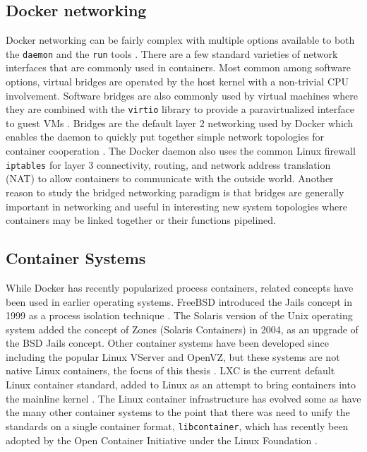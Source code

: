\subsection{Docker networking} %
\label{sub:dockernetworking}
Docker networking can be fairly complex with multiple options available to both the \texttt{daemon} and the \texttt{run} tools \autocite{dockernetworking1}.
There are a few standard varieties of network interfaces that are commonly used in containers.
Most common among software options, virtual bridges are operated by the host kernel with a non-trivial CPU involvement. 
Software bridges are also commonly used by virtual machines where they are combined with the \texttt{virtio} library to provide a paravirtualized interface to guest VMs \autocite{_virtio_1}. 
Bridges are the default layer 2 networking used by Docker which enables the daemon to quickly put together simple network topologies for container cooperation \autocite{dockernetworking1}.  
The Docker daemon also uses the common Linux firewall \texttt{iptables} for layer 3 connectivity, routing, and network address translation (NAT) to allow containers to communicate with the outside world.
Another reason to study the bridged networking paradigm is that bridges are generally important in networking and useful in interesting new system topologies where containers may be linked together or their functions pipelined.

\subsection{Container Systems} %
\label{sec:container_systems}
While Docker has recently popularized process containers, related concepts have been used in earlier operating systems.
FreeBSD introduced the Jails concept in 1999 as a process isolation technique \autocite{_zones_1}.  
The Solaris version of the Unix operating system added the concept of Zones (Solaris Containers) in 2004, as an upgrade of the BSD Jails concept.  
Other container systems have been developed since including the popular Linux VServer and OpenVZ, but these systems are not native Linux containers, the focus of this thesis \autocite{rathore2013kvm, _scheepers_1, des2005virtualization}.  
LXC is the current default Linux container standard, added to Linux as an attempt to bring containers into the mainline kernel \autocite{dockersecurity1}.
The Linux container infrastructure has evolved some as have the many other container systems to the point that there was need to unify the standards on a single container format, \texttt{libcontainer}, which has recently been adopted by the Open Container Initiative under the Linux Foundation \autocite{_oci_1}.  

